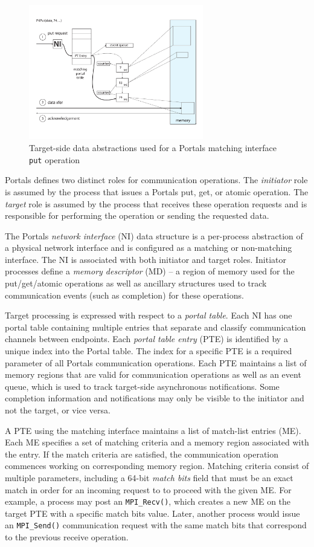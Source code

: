 \begin{figure}[ht]
  \centering
  \includegraphics[width=3in]{figs/portals_put}
  \caption{Target-side data abstractions used for a Portals matching interface {\tt put} operation}
  \label{fig:portals_put}
\end{figure}

Portals defines two distinct roles for communication operations. The {\em
  initiator} role is assumed by the process that issues a Portals put, get, or
atomic operation. The {\em target} role is assumed by the process that receives
these operation requests and is responsible for performing the operation or
sending the requested data.

The Portals {\em network interface} (NI) data structure is a per-process
abstraction of a physical network interface and is configured as a
matching or non-matching interface. The NI is associated with both
initiator and target roles. Initiator processes define a {\em memory
  descriptor} (MD) -- a region of memory used for the put/get/atomic
operations as well as ancillary structures used to track communication
events (such as completion) for these operations.

Target processing is expressed with respect to a {\em portal table}. Each NI has one portal 
table containing multiple entries that separate and
classify communication channels between endpoints.  Each {\em portal table
  entry} (PTE) is identified by a unique index into the Portal table. The index
for a specific PTE is a required parameter of all Portals communication
operations. Each PTE maintains a list of memory regions that are valid for
communication operations as well as an event queue, which is used to track
target-side asynchronous notifications.  Some completion information and
notifications may only be visible to the initiator and not the target, or vice
versa.

A PTE using the matching interface maintains a list of match-list entries (ME).
Each ME specifies a set of matching criteria and a memory region associated
with the entry. If the match criteria are satisfied, the communication
operation commences working on corresponding memory region. Matching criteria
consist of multiple parameters, including a 64-bit {\em match bits} field
that must be an exact match in order for an incoming request to to proceed
with the given ME. For example, a process may post an {\tt MPI\_Recv()}, which
creates a new ME on the target PTE with a specific match bits value. Later,
another process would issue an {\tt MPI\_Send()} communication request with
the same match bits that correspond to the previous receive operation.

